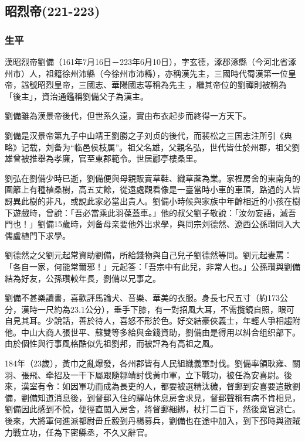 
\subsection{昭烈帝\tiny(221-223)}

\subsubsection{生平}

漢昭烈帝劉備（161年7月16日－223年6月10日），字玄德，涿郡涿縣（今河北省涿州市）人，祖籍徐州沛縣（今徐州市沛縣），亦稱漢先主，三國時代蜀漢第一位皇帝，諡號昭烈皇帝，三國志、華陽國志等稱為先主 ，繼其帝位的劉禪則被稱為「後主」，資治通鑑稱劉備父子為漢主。

劉備雖為漢景帝後代，但世系久遠，實由布衣起步而終得一方天下。

劉備是汉景帝第九子中山靖王劉勝之子刘贞的後代，而裴松之三国志注所引《典略》记载，刘备为“临邑侯枝属”。祖父名雄，父親名弘，世代皆仕於州郡，祖父劉雄曾被推舉為孝廉，官至東郡範令。世居酈亭樓桑里。

劉弘在劉備少時已逝，劉備便與母親販賣草鞋、織草蓆為業。家裡房舍的東南角的圍籬上有種植桑樹，高五丈餘，從遠處觀看像是一臺當時小車的車頂，路過的人皆訝異此樹的非凡，或說此家必當出貴人。劉備小時候與家族中年齡相近的小孩在樹下遊戲時，曾說：「吾必當乘此羽葆蓋車。」他的叔父劉子敬說：「汝勿妄語，滅吾門也！」劉備15歲時，刘备母亲要他外出求學，與同宗刘德然、遼西公孫瓚同入大儒盧植門下求學。

劉德然之父劉元起常資助劉備，所給錢物與自己兒子劉德然等同。劉元起妻罵：「各自一家，何能常爾邪！」元起答：「吾宗中有此兒，非常人也。」公孫瓚與劉備結為好友，公孫瓚較年長，劉備以兄事之。

劉備不甚樂讀書，喜歡評馬論犬、音樂、華美的衣服。身長七尺五寸（約173公分，漢時一尺約為23.1公分），垂手下膝，有一對招風大耳，不需攬鏡自照，眼可自見其耳。少說話，善於待人，喜怒不形於色。好交結豪俠義士，年輕人爭相趨附他。中山大商人張世平、蘇雙等多給與金錢資助，劉備由是得用以糾合组织部下。由於個性與行事風格酷似先祖劉邦，而被評為有高祖之風。

184年（23歲），黃巾之亂爆發，各州郡皆有人民組織義軍討伐。劉備率領耿雍、關羽、張飛、牵招及一干下屬跟隨鄒靖討伐黃巾軍，立下戰功，被任為安喜尉。後來，漢室有令：如因軍功而成為長吏的人，都要被選精汰穢，督郵到安喜要遣散劉備，劉備知道消息後，到督郵入住的驛站休息房舍求見，督郵聲稱有病不肯相見，劉備因此感到不悅，便徑直闖入房舍，將督郵綑綁，杖打二百下，然後棄官逃亡。後來，大將軍何進派都尉毌丘毅到丹楊募兵，劉備也在途中加入，到下邳時與盜賊力戰立功，任為下密縣丞，不久又辭官。

